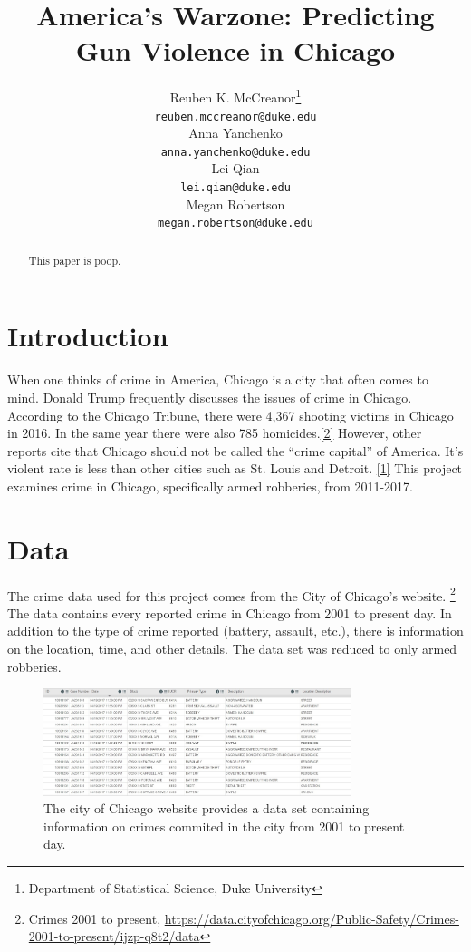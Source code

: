 \documentclass{article} %
\title{America's Warzone: Predicting Gun Violence in Chicago}
\author{
Reuben K. McCreanor\thanks{Department of Statistical Science, Duke University} \\  
\texttt{reuben.mccreanor@duke.edu} \\
\And
Anna Yanchenko\footnotemark[1] \\
\texttt{anna.yanchenko@duke.edu} \\
\And 
Lei Qian\footnotemark[1] \\
\texttt{lei.qian@duke.edu} \\
\And
Megan Robertson\footnotemark[1] \\
\texttt{megan.robertson@duke.edu} \\ 
}
\begin{document}
\maketitle

\begin{abstract}
This paper is poop. \newline
\end{abstract}

\section{Introduction}
\label{headings}

\noindent When one thinks of crime in America, Chicago is a city that often comes to mind. Donald Trump frequently discusses the issues of crime in Chicago. According to the Chicago Tribune, there were 4,367 shooting victims in Chicago in 2016. In the same year there were also 785 homicides.\hyperlink{Ref2}{[2]} However, other reports cite that Chicago should not be called the “crime capital” of America. It’s violent rate is less than other cities such as St.  Louis and Detroit. \hyperlink{Ref1}{[1]} This project examines crime in Chicago, specifically armed robberies, from 2011-2017. \newline

\section{Data}
\label{headings}

\noindent The crime data used for this project comes from the City of Chicago’s website. \footnote{Crimes 2001 to present, \url{https://data.cityofchicago.org/Public-Safety/Crimes-2001-to-present/ijzp-q8t2/data}} The data contains every reported crime in Chicago from 2001 to present day. In addition to the type of crime reported (battery, assault, etc.), there is information on the location, time, and other details. The data set was reduced to only armed robberies. 

\begin{figure}[h]
\begin{center}

\includegraphics[width=0.8\textwidth,keepaspectratio]{data.jpg}
\caption{The city of Chicago website provides a data set containing information on crimes commited in the city from 2001 to present day.}
\label{data}
\end{center}
\end{figure}
\end{document}
